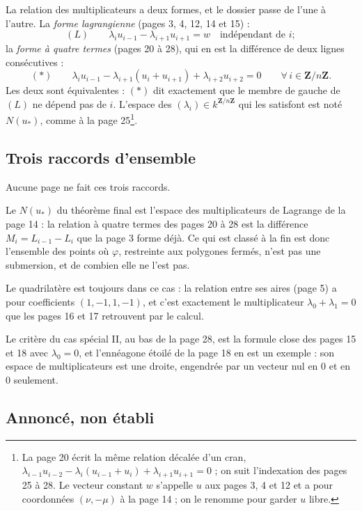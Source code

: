 \documentclass[11pt,a4paper]{article}
\begin{document}
La relation des multiplicateurs a deux formes, et le dossier passe de l'une à
l'autre. La \emph{forme lagrangienne} (pages 3, 4, 12, 14 et 15) :
\[
  (L) \qquad \lambda_i u_{i-1} - \lambda_{i+1} u_{i+1} = w
  \quad \text{indépendant de } i ;
\]
la \emph{forme à quatre termes} (pages 20 à 28), qui en est la différence de
deux lignes consécutives :
\[
  (\ast) \qquad \lambda_i u_{i-1} - \lambda_{i+1}(u_i + u_{i+1})
  + \lambda_{i+2} u_{i+2} = 0 \qquad \forall\, i \in \mathbf{Z}/n\mathbf{Z} .
\]
Les deux sont équivalentes : $(\ast)$ dit exactement que le membre de gauche de
$(L)$ ne dépend pas de $i$. L'espace des $(\lambda_i) \in
k^{\mathbf{Z}/n\mathbf{Z}}$ qui les satisfont est noté $N(u_*)$, comme à la
page 25\footnote{La page 20 écrit la même relation décalée d'un cran,
$\lambda_{i-1} u_{i-2} - \lambda_i (u_{i-1} + u_i) + \lambda_{i+1} u_{i+1} = 0$ ;
on suit l'indexation des pages 25 à 28. Le vecteur constant $w$ s'appelle $u$
aux pages 3, 4 et 12 et a pour coordonnées $(\nu, -\mu)$ à la page 14 ; on le
renomme pour garder $u$ libre.}.

\subsection*{Trois raccords d'ensemble}

Aucune page ne fait ces trois raccords.

Le $N(u_*)$ du théorème final est l'espace des multiplicateurs de Lagrange de
la page 14 : la relation à quatre termes des pages 20 à 28 est la différence
$M_i = L_{i-1} - L_i$ que la page 3 forme déjà. Ce qui est classé à la fin est
donc l'ensemble des points où $\varphi$, restreinte aux polygones fermés, n'est
pas une submersion, et de combien elle ne l'est pas.

Le quadrilatère est toujours dans ce cas : la relation entre ses aires
(page 5) a pour coefficients $(1, -1, 1, -1)$, et c'est exactement le
multiplicateur $\lambda_0 + \lambda_1 = 0$ que les pages 16 et 17 retrouvent
par le calcul.

Le critère du cas spécial II, au bas de la page 28, est la formule close des
pages 15 et 18 avec $\lambda_0 = 0$, et l'ennéagone étoilé de la page 18 en
est un exemple : son espace de multiplicateurs est une droite, engendrée par
un vecteur nul en $0$ et en $0$ seulement.

\subsection*{Annoncé, non établi}
\end{document}
